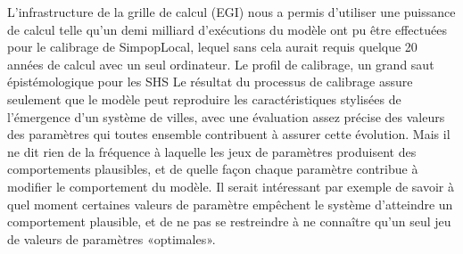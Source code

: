 \documentclass[10pt]{article}
\begin{document}
L’infrastructure de la grille de calcul (EGI) nous a permis d’utiliser une puissance de calcul telle qu’un demi milliard d’exécutions du modèle ont pu être effectuées pour le calibrage de SimpopLocal, lequel sans cela aurait requis quelque 20 années de calcul avec un seul ordinateur.
Le profil de calibrage, un grand saut épistémologique pour les SHS
Le résultat du processus de calibrage assure seulement que le modèle peut reproduire les caractéristiques stylisées de l’émergence d’un système de villes, avec une évaluation assez précise des valeurs des paramètres qui toutes ensemble contribuent à assurer cette évolution. Mais il ne dit rien de la fréquence à laquelle les jeux de paramètres produisent des comportements plausibles, et de quelle façon chaque paramètre contribue à modifier le comportement du modèle. Il serait intéressant par exemple de savoir à quel moment certaines valeurs de paramètre empêchent le système d’atteindre un comportement plausible, et de ne pas se restreindre à ne connaître qu'un seul jeu de valeurs de paramètres «optimales». 
\end{document}
